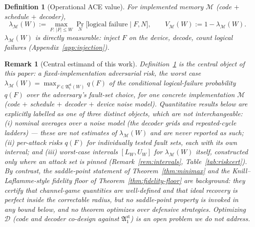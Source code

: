 \documentclass[11pt,a4paper]{article}
\newtheorem{definition}{Definition}\newtheorem{assumption}{Assumption}
\newtheorem{remark}{Remark}
\begin{document}
\begin{definition}[Operational ACE value]\label{def:acevalue}
For implemented memory $\mathcal{M}$ (code $+$ schedule $+$ decoder),
\[
\lambda_{\mathcal{M}}(W):=\max_{F:\,|F|\le W}
\Pr_{N}\!\big[\text{logical failure}\mid F,N\big],
\qquad V_{\mathcal{M}}(W):=1-\lambda_{\mathcal{M}}(W).
\]
$\lambda_{\mathcal{M}}(W)$ is directly measurable: inject $F$ on the
device, decode, count logical failures
(Appendix~\ref{app:injection}).
\end{definition}

\begin{remark}[Central estimand of this work]\label{rem:central-estimand}
Definition~\ref{def:acevalue} is the central object of this paper: a
\emph{fixed-implementation} adversarial risk, the worst case
$\lambda_{\mathcal{M}}(W)=\max_{F\in\mathfrak{A}_1^{\mathrm{st}}(W)}
q(F)$ of the conditional logical-failure probability $q(F)$ over the
adversary's fault-set choice, for one concrete implementation
$\mathcal{M}$ (code $+$ schedule $+$ decoder $+$ device noise model).
Quantitative results below are explicitly labelled as one of three
distinct objects, which are not interchangeable: \emph{(i) nominal
averages} over a noise model (the decoder grids and repeated-cycle
ladders) --- these are \emph{not} estimates of $\lambda_{\mathcal{M}}(W)$
and are never reported as such; \emph{(ii) per-attack risks} $q(F)$ for
individually tested fault sets, each with its own interval; and
\emph{(iii) worst-case intervals} $[L_W,U_W]$ for
$\lambda_{\mathcal{M}}(W)$ itself, constructed only where an attack set
is pinned (Remark~\ref{rem:intervals}, Table~\ref{tab:riskcert}).
By contrast, the saddle-point
statement of Theorem~\ref{thm:minimax} and the Knill--Laflamme-style
fidelity floor of Theorem~\ref{thm:fidelity-floor} are background:
they certify that channel-game quantities are well-defined and that
ideal recovery is perfect inside the correctable radius, but no
saddle-point property is invoked in any bound below, and no theorem
optimizes over defensive strategies. Optimizing $\mathcal{D}$ (code
and decoder co-design against $\mathfrak{A}_1^{\mathrm{st}}$) is an
open problem we do not address.
\end{remark}
\end{document}
